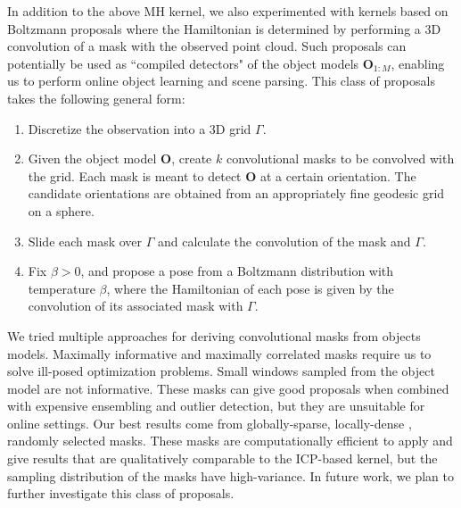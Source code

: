 In addition to the above MH kernel, we also experimented with kernels based on
Boltzmann proposals where the Hamiltonian is determined by performing a 3D
convolution of a mask with the observed point cloud. Such
proposals can potentially be used as ``compiled detectors" of the object models
$\mathbf{O}_{1:M}$, enabling us to perform online object learning and scene
parsing. This class of proposals takes the following general form:
\begin{enumerate}
\item Discretize the observation into a 3D grid $\Gamma$.
\item Given the object model $\mathbf{O}$, create $k$ convolutional masks to be
convolved with the grid. Each mask is meant to detect $\mathbf{O}$ at a certain
orientation. The candidate orientations are obtained from an appropriately fine
geodesic grid on a sphere.
\item Slide each mask over $\Gamma$ and calculate the convolution of the mask
and $\Gamma$. 
\item Fix $\beta > 0$, and propose a pose from a Boltzmann distribution
with temperature $\beta$, where the Hamiltonian of each pose is given by the
convolution of its associated mask with $\Gamma$.
\end{enumerate}
We tried multiple approaches for deriving convolutional masks from objects
models. Maximally informative and maximally correlated masks require us to
solve ill-posed optimization problems. Small windows sampled from the object
model are not informative. These masks can give good proposals when combined
with expensive ensembling and outlier detection, but they are unsuitable for
online settings. Our best results come from globally-sparse, locally-dense
\cite{schnabel2007efficient}, randomly selected masks. These masks are
computationally efficient to apply and give results that are qualitatively
comparable to the ICP-based kernel, but the sampling distribution of the masks
have high-variance. In future work, we plan to further investigate this class
of proposals.
